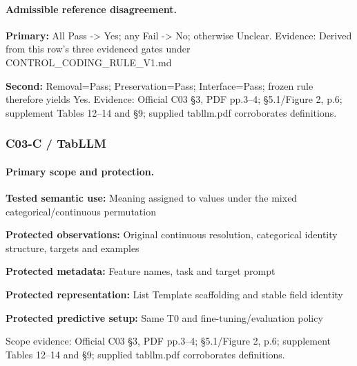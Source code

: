 \documentclass[10pt]{article}
\begin{document}
\paragraph{Admissible reference disagreement.}
\textbf{Primary:} All Pass -> Yes; any Fail -> No; otherwise Unclear. Evidence: Derived from this row’s three evidenced gates under CONTROL\_CODING\_RULE\_V1.md\par
\textbf{Second:} Removal=Pass; Preservation=Pass; Interface=Pass; frozen rule therefore yields Yes. Evidence: Official C03 §3, PDF pp.3--4; §5.1/Figure 2, p.6; supplement Tables 12--14 and §9; supplied tabllm.pdf corroborates definitions.\par
\subsubsection*{C03-C / TabLLM}
\paragraph{Primary scope and protection.}
\textbf{Tested semantic use:} Meaning assigned to values under the mixed categorical/continuous permutation\par
\textbf{Protected observations:} Original continuous resolution, categorical identity structure, targets and examples\par
\textbf{Protected metadata:} Feature names, task and target prompt\par
\textbf{Protected representation:} List Template scaffolding and stable field identity\par
\textbf{Protected predictive setup:} Same T0 and fine-tuning/evaluation policy\par
Scope evidence: Official C03 §3, PDF pp.3--4; §5.1/Figure 2, p.6; supplement Tables 12--14 and §9; supplied tabllm.pdf corroborates definitions.\par
\end{document}
